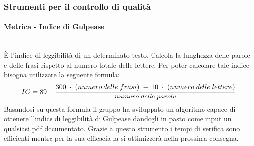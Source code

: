 \subsubsection{Strumenti per il controllo di qualità}
\paragraph{Metrica - Indice di Gulpease}\mbox{}\\
È l'indice di leggibilità di un determinato testo. Calcola la lunghezza delle parole e delle frasi rispetto al numero totale delle lettere. Per poter calcolare tale indice bisogna utilizzare la seguente formula:
$$IG = 89 + {{300 \; \cdot \; (numero\; delle \; frasi) \; - \; 10 \; \cdot \; (numero \; delle \; lettere)}\over numero \; delle \; parole}$$
Basandosi su questa formula il gruppo \Gruppo ha sviluppato un algoritmo capace di ottenere l'indice di leggibilità di Gulpease dandogli in pasto come input un qualsiasi pdf 
documentato. Grazie a questo strumento i tempi di verifica sono efficienti mentre per la sua efficacia la si ottimizzerà nella prossima consegna.
